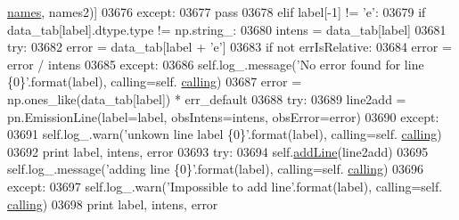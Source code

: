 \begin{DoxyCode}
{{{{{{{{{{{{{{{{{{{{{{      \hyperlink{classpyneb_1_1core_1_1pynebcore_1_1_observation_a3f365d0b1488b2eba300bf71caf23c17}{names}, names2)]
03676                     \textcolor{keywordflow}{except}:
03677                         \textcolor{keywordflow}{pass}
03678                 \textcolor{keywordflow}{elif} label[-1] != \textcolor{stringliteral}{'e'}:
03679                     \textcolor{keywordflow}{if} data\_tab[label].dtype.type != np.string\_:
03680                         intens = data\_tab[label]
03681                         \textcolor{keywordflow}{try}:
03682                             error = data\_tab[label + \textcolor{stringliteral}{'e'}]
03683                             \textcolor{keywordflow}{if} \textcolor{keywordflow}{not} errIsRelative:
03684                                 error = error / intens
03685                         \textcolor{keywordflow}{except}:
03686                             self.log\_.message(\textcolor{stringliteral}{'No error found for line \{0\}'}.format(label), calling=self.
      \hyperlink{classpyneb_1_1core_1_1pynebcore_1_1_observation_a2639fad9af4fefad20e4097295bd40e7}{calling})
03687                             error = np.ones\_like(data\_tab[label]) * err\_default
03688                         \textcolor{keywordflow}{try}:
03689                             line2add = pn.EmissionLine(label=label, obsIntens=intens, obsError=error)
03690                         \textcolor{keywordflow}{except}:
03691                             self.log\_.warn(\textcolor{stringliteral}{'unkown line label \{0\}'}.format(label), calling=self.
      \hyperlink{classpyneb_1_1core_1_1pynebcore_1_1_observation_a2639fad9af4fefad20e4097295bd40e7}{calling})
03692                             \textcolor{keywordflow}{print} label, intens, error 
03693                         \textcolor{keywordflow}{try}:
03694                             self.\hyperlink{classpyneb_1_1core_1_1pynebcore_1_1_observation_a5f4b01dbeb8d50963fb7fa21b94bfc17}{addLine}(line2add)
03695                             self.log\_.message(\textcolor{stringliteral}{'adding line \{0\}'}.format(label), calling=self.
      \hyperlink{classpyneb_1_1core_1_1pynebcore_1_1_observation_a2639fad9af4fefad20e4097295bd40e7}{calling})
03696                         \textcolor{keywordflow}{except}:
03697                             self.log\_.warn(\textcolor{stringliteral}{'Impossible to add line'}.format(label), calling=self.
      \hyperlink{classpyneb_1_1core_1_1pynebcore_1_1_observation_a2639fad9af4fefad20e4097295bd40e7}{calling})
03698                             \textcolor{keywordflow}{print} label, intens, error
}}}}}}}}}}}}}}}}}}}}}}
\end{DoxyCode}
